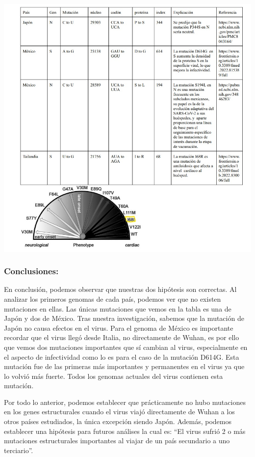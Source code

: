 \documentclass[
  12pt,
]{article}
\begin{document}
\includegraphics{Archivos/Image4.jpeg}

\hypertarget{conclusiones}{%
\subsubsection{Conclusiones:}\label{conclusiones}}

En conclusión, podemos observar que nuestras dos hipótesis son
correctas. Al analizar los primeros genomas de cada país, podemos ver
que no existen mutaciones en ellas. Las únicas mutaciones que vemos en
la tabla es una de Japón y dos de México. Tras nuestra investigación,
sabemos que la mutación de Japón no causa efectos en el virus. Para el
genoma de México es importante recordar que el virus llegó desde Italia,
no directamente de Wuhan, es por ello que vemos dos mutaciones
importantes que sí cambian al virus, especialmente en el aspecto de
infectividad como lo es para el caso de la mutación D614G. Esta mutación
fue de las primeras más importantes y permanentes en el virus ya que lo
volvió más fuerte. Todos los genomas actuales del virus contienen esta
mutación.

Por todo lo anterior, podemos establecer que prácticamente no hubo
mutaciones en los genes estructurales cuando el virus viajó directamente
de Wuhan a los otros países estudiados, la única excepción siendo Japón.
Además, podemos establecer una hipótesis para futuros análises la cual
es: ``El virus sufrió 2 o más mutaciones estructurales importantes al
viajar de un país secundario a uno terciario''.
\end{document}

